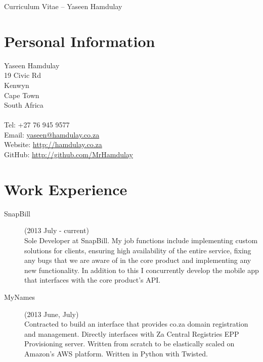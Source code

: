 \documentclass[margin,line,a4paper]{resume}
\begin{document}
    {\sc \Large Curriculum Vitae -- Yaseen Hamdulay}
    \begin{resume}
        \vspace{0.5cm}

        \section{\mysidestyle Personal Information}
            Yaseen Hamdulay\\
            19 Civic Rd\\ %
            Kenwyn\\
            Cape Town\\
            South Africa\\
            \\
            Tel: +27 76 945 9577\\
            Email: \href{mailto:yaseen@hamdulay.co.za}{yaseen@hamdulay.co.za}\\
            Website: \href{http://hamdulay.co.za}{http://hamdulay.co.za}\\
            GitHub: \href{http://github.com/MrHamdulay}{http://github.com/MrHamdulay}\\

        \section{\mysidestyle Work Experience}
            \begin{description}
                \item[SnapBill] (2013 July - current) \\
                    Sole Developer at SnapBill. My job functions include implementing custom solutions for clients,
                    ensuring high availability of the entire service, fixing any bugs that we are aware of in the
                    core product and implementing any new functionality. In addition to this I concurrently develop
                    the mobile app that interfaces with the core product's API.

                \item[MyNames] (2013 June, July) \\
                    Contracted to build an interface that provides co.za domain registration and management. 
                    Directly interfaces with Za Central Registries EPP Provisioning server. Written from scratch
                    to be elastically scaled on Amazon's AWS platform. Written in Python with Twisted.


\end{description}
\end{resume}
\end{document}
